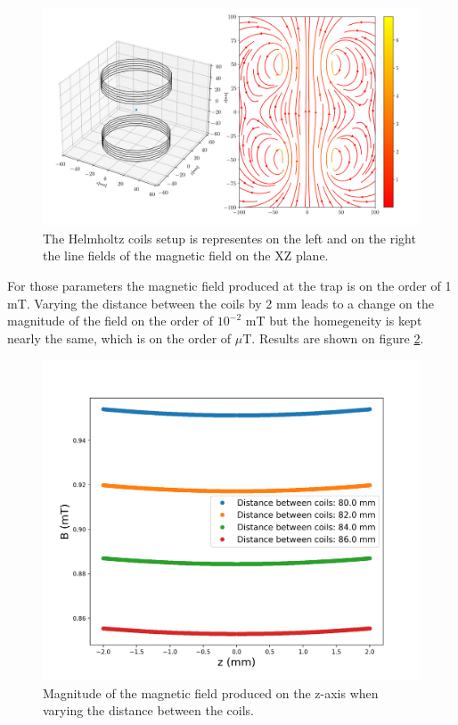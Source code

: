 \documentclass[
10pt, %
a4paper, %
oneside, %
headinclude,footinclude, %
BCOR5mm, %
]{scrartcl}
\begin{document}
\begin{figure}[t]
    \includegraphics[width=\linewidth]{XZplane_6turns_20amps_radius40mm_d80}
    \centering
    \caption{The Helmholtz coils setup is representes on the left and on the right the line fields of the magnetic field on the XZ plane.}
    \label{helmholtz}
\end{figure}


For those parameters the magnetic field produced at the trap is on the order of 1 mT. Varying the distance between the coils by 2 mm leads to a change on the magnitude of the field on the order of $10^{-2}$ mT but the homegeneity is kept nearly the same, which is on the order of $\mu$T. Results are shown on figure \ref{dist}.


\begin{figure}[t]
    \includegraphics[width=\linewidth]{varying_distance_between_coils.png}
    \centering
    \caption{Magnitude of the magnetic field produced on the z-axis when varying the distance between the coils.}
    \label{dist}
\end{figure}
\end{document}
